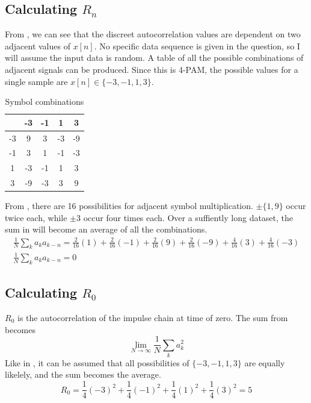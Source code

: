 \documentclass[11pt]{article}
\begin{document}
\subsection{Calculating $R_n$\label{calcrn}}
From , we can see that the discreet autocorrelation values are
dependent on two adjacent values of $x[n]$. No specific data sequence is given
in the question, so I will assume the input data is random. A table of all the
possible combinations of adjacent signals can be produced. Since this is 4-PAM,
the possible values for a single sample are $x[n] \in \{-3, -1, 1, 3\}$.
\begin{table}[H]
    \begin{center}
        \begin{tabular}{c|c c c c}
               & -3 & -1 & 1  & 3  \\
            \hline
            -3 & 9  & 3  & -3 & -9 \\
            -1 & 3  & 1  & -1 & -3 \\
            1  & -3 & -1 & 1  & 3  \\
            3  & -9 & -3 & 3  & 9
        \end{tabular}
    \end{center}
    \caption{Symbol combinations\label{combos}}
\end{table}
From , there are 16 possibilities for adjacent symbol
multiplication. $\pm\{1, 9\}$ occur twice each, while $\pm 3$ occur four
times each. Over a suffiently long dataset, the sum in  will become an
average of all the combinations.
\begin{equation}
    \begin{gathered}
        \frac{1}{N} \sum_k a_k a_{k-n} = \frac{2}{16}(1) + \frac{2}{16}(-1) +
        \frac{2}{16}(9) + \frac{2}{16}(-9) + \frac{4}{16}(3) + \frac{4}{16}(-3)
        \\
        \frac{1}{N} \sum_k a_k a_{k-n} = 0
    \end{gathered}
\end{equation}

\subsection{Calculating $R_0$}
$R_0$ is the autocorrelation of the impulse chain at time of zero. The sum from
 becomes
\begin{equation}
    \lim_{N \to \infty}  \frac{1}{N}\sum_k a_k^2
\end{equation}
Like in , it can be assumed that all possibilities of $\{-3, -1, 1,
    3\}$ are equally likelely, and the sum becomes the average.
\begin{equation}
    R_0 = \frac{1}{4}(-3)^2 + \frac{1}{4}(-1)^2 + \frac{1}{4}(1)^2 +
    \frac{1}{4}(3)^2 = 5
\end{equation}
\end{document}
